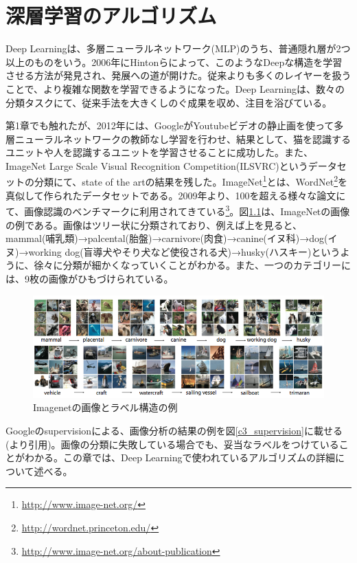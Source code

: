 \chapter{深層学習のアルゴリズム}
Deep Learningは、多層ニューラルネットワーク(MLP)のうち、普通隠れ層が2つ以上のものをいう。2006年にHintonらによって、このようなDeepな構造を学習させる方法が発見され、発展への道が開けた\cite{hinton2006a-fast, hinton2006reducing}。従来よりも多くのレイヤーを扱うことで、より複雑な関数を学習できるようになった。Deep Learningは、数々の分類タスクにて、従来手法を大きくしのぐ成果を収め、注目を浴びている。\par
第1章でも触れたが、2012年には、GoogleがYoutubeビデオの静止画を使って多層ニューラルネットワークの教師なし学習を行わせ、結果として、猫を認識するユニットや人を認識するユニットを学習させることに成功した。また、ImageNet Large Scale Visual Recognition Competition(ILSVRC)というデータセット\cite{deng2009imagenet:}の分類にて、state of the artの結果を残した。ImageNet\footnote{\url{http://www.image-net.org/}}とは、WordNet\footnote{\url{http://wordnet.princeton.edu/}}を真似して作られたデータセットである。2009年より、100を超える様々な論文にて、画像認識のベンチマークに利用されてきている\footnote{\url{http://www.image-net.org/about-publication}}。図\ref{c3_imagenet}は、ImageNetの画像の例である。画像はツリー状に分類されており、例えば上を見ると、mammal(哺乳類)→palcental(胎盤)→carnivore(肉食)→canine(イヌ科)→dog(イヌ)→working dog(盲導犬やそり犬など使役される犬)→husky(ハスキー)というように、徐々に分類が細かくなっていくことがわかる。また、一つのカテゴリーには、9枚の画像がひもづけられている。\par
\begin{figure}[tbp]
 \begin{center}
  \includegraphics[width=120mm]{img/c3/imagenet}
 \end{center}
 \caption{Imagenetの画像とラベル構造の例}
 \label{c3_imagenet}
\end{figure}
Googleのsupervisionによる、画像分析の結果の例を図\ref{c3_supervision}に載せる(\cite{krizhevsky2012imagenet}より引用)。画像の分類に失敗している場合でも、妥当なラベルをつけていることがわかる。この章では、Deep Learningで使われているアルゴリズムの詳細について述べる。
